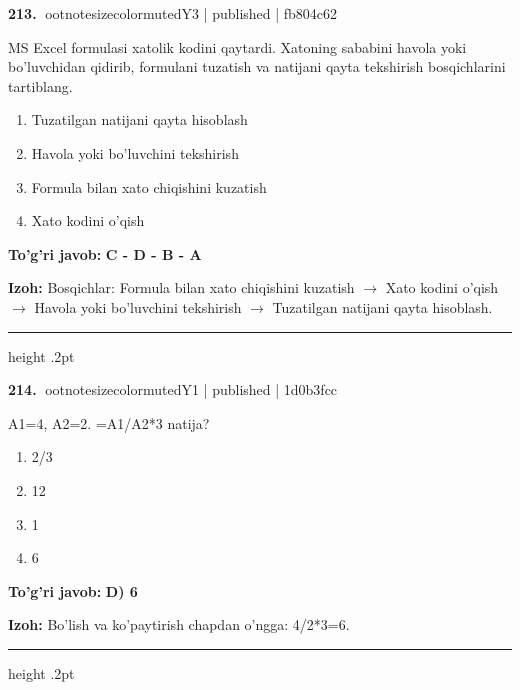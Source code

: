 \documentclass[10pt,a4paper]{article}
\begin{document}
\textbf{\color{ink}213.} {ootnotesizecolor{muted}Y3 | published | fb804c62}
\par
MS Excel formulasi xatolik kodini qaytardi. Xatoning sababini havola yoki bo'luvchidan qidirib, formulani tuzatish va natijani qayta tekshirish bosqichlarini tartiblang.
\begin{enumerate}[label=\Alph*),leftmargin=9mm]
\item Tuzatilgan natijani qayta hisoblash
\item Havola yoki bo'luvchini tekshirish
\item Formula bilan xato chiqishini kuzatish
\item Xato kodini o'qish
\end{enumerate}
\begin{tcolorbox}[enhanced,breakable,colback=teal!4,colframe=teal!55!black,boxrule=0.45pt,arc=1.2mm,left=2.8mm,right=2.8mm,top=2mm,bottom=2mm]
\textbf{\color{teal}To'g'ri javob:} \textbf{C - D - B - A}
\par\smallskip
\textbf{Izoh:} Bosqichlar: Formula bilan xato chiqishini kuzatish \ensuremath{\rightarrow} Xato kodini o'qish \ensuremath{\rightarrow} Havola yoki bo'luvchini tekshirish \ensuremath{\rightarrow} Tuzatilgan natijani qayta hisoblash.
\end{tcolorbox}
\vspace{2mm}\hrule height .2pt\vspace{2mm}

\textbf{\color{ink}214.} {ootnotesizecolor{muted}Y1 | published | 1d0b3fcc}
\par
A1=4, A2=2. =A1/A2*3 natija?
\begin{enumerate}[label=\Alph*),leftmargin=9mm]
\item 2/3
\item 12
\item 1
\item 6
\end{enumerate}
\begin{tcolorbox}[enhanced,breakable,colback=teal!4,colframe=teal!55!black,boxrule=0.45pt,arc=1.2mm,left=2.8mm,right=2.8mm,top=2mm,bottom=2mm]
\textbf{\color{teal}To'g'ri javob:} \textbf{D) 6}
\par\smallskip
\textbf{Izoh:} Bo'lish va ko'paytirish chapdan o'ngga: 4/2*3=6.
\end{tcolorbox}
\vspace{2mm}\hrule height .2pt\vspace{2mm}
\end{document}
